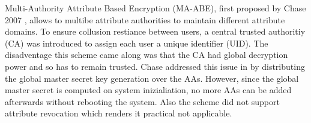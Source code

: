 \documentclass[twocolumn]{article}
\begin{document}
Multi-Authority Attribute Based Encryption (MA-ABE), first proposed by Chase 2007 \cite{chase2007multi}, allows to multibe attribute authorities to maintain different attribute domains. To ensure collusion restiance between users, a central trusted authoritiy (CA) was introduced to assign each user a unique identifier (UID). The disadventage this scheme came along was that the CA had global decryption power and so has to remain trusted. 
Chase addressed this issue in \cite{chase2009improving} by distributing the global master secret key generation over the AAs. However, since the global master secret is computed on system inizialiation, no more AAs can be added afterwards without rebooting the system. Also the scheme did not support attribute revocation which renders it practical not applicable. 

\end{document}
